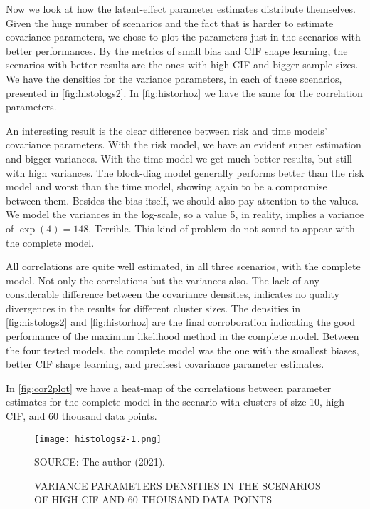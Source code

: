 Now we look at how the latent-effect parameter estimates distribute
themselves. Given the huge number of scenarios and the fact that is
harder to estimate covariance parameters, we chose to plot the
parameters just in the scenarios with better performances. By the
metrics of small bias and CIF shape learning, the scenarios with better
results are the ones with high CIF and bigger sample sizes. We have the
densities for the variance parameters, in each of these scenarios,
presented in \autoref{fig:histologs2}. In \autoref{fig:historhoz} we
have the same for the correlation parameters.

An interesting result is the clear difference between risk and time
models' covariance parameters. With the risk model, we have an evident
super estimation and bigger variances. With the time model we get much
better results, but still with high variances. The block-diag model
generally performs better than the risk model and worst than the time
model, showing again to be a compromise between them. Besides the bias
itself, we should also pay attention to the values. We model the
variances in the log-scale, so a value 5, in reality, implies a variance
of \(\exp(4) = 148\). Terrible. This kind of problem do not sound to
appear with the complete model.

All correlations are quite well estimated, in all three scenarios, with
the complete model. Not only the correlations but the variances
also. The lack of any considerable difference between the covariance
densities, indicates no quality divergences in the results for different
cluster sizes. The densities in \autoref{fig:histologs2} and
\autoref{fig:historhoz} are the final corroboration indicating the good
performance of the maximum likelihood method in the complete
model. Between the four tested models, the complete model was the one
with the smallest biases, better CIF shape learning, and precisest
covariance parameter estimates.

In \autoref{fig:cor2plot} we have a heat-map of the correlations between
parameter estimates for the complete model in the scenario with clusters
of size 10, high CIF, and 60 thousand data points.

\begin{figure}[!htpb]
 \setlength{\abovecaptionskip}{.0001pt}
 \caption{VARIANCE PARAMETERS DENSITIES IN THE SCENARIOS OF HIGH CIF AND
          60 THOUSAND DATA POINTS}
 \vspace{0.2cm}\centering
 \texttt{[image: histologs2-1.png]}\\
 \begin{footnotesize}
  SOURCE: The author (2021).
 \end{footnotesize}
 \label{fig:histologs2}
\end{figure}

